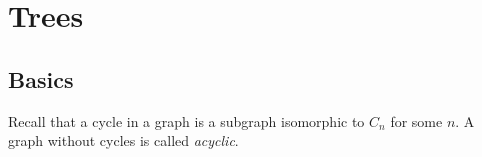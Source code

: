 \section{Trees}
\subsection{Basics}
Recall that a cycle in a graph is a subgraph isomorphic to $C_n$ for some $n$.
A graph without cycles is called \emph{acyclic}.